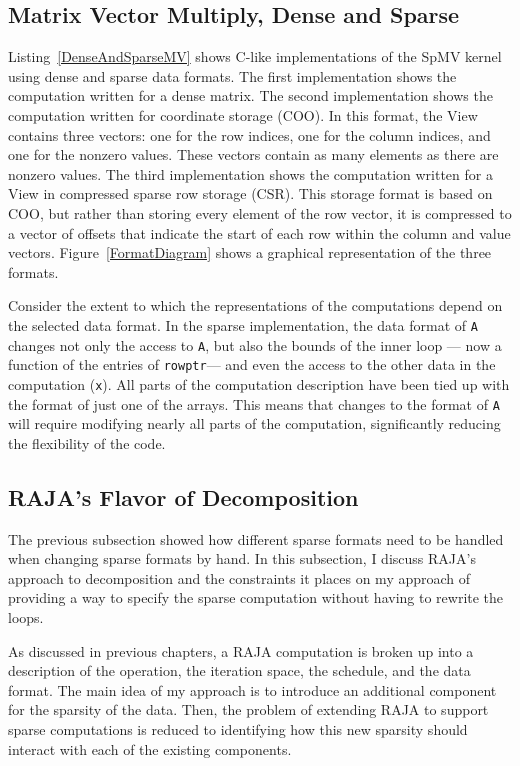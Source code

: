 \subsection{Matrix Vector Multiply, Dense and Sparse}

Listing~\ref{DenseAndSparseMV} shows C-like implementations of the SpMV kernel using dense and sparse data formats.
The first implementation shows the computation written for a dense matrix.
The second implementation shows the computation written for coordinate storage (COO). 
In this format, the View contains three vectors: one for the row indices, one for the column indices, and one for the nonzero values.
These vectors contain as many elements as there are nonzero values.
The third implementation shows the computation written for a View in compressed sparse row storage (CSR).
This storage format is based on COO, but rather than storing every element of the row vector, it is compressed to a vector of offsets that indicate the start of each row within the column and value vectors.
Figure~\ref{FormatDiagram} shows a graphical representation of the three formats.



Consider the extent to which the representations of the computations depend on the selected data format.
In the sparse implementation, the data format of \verb.A. changes not only the access to \verb.A., but also the bounds of the inner loop --- now a function of the entries of \verb.rowptr.--- and even the access to the other data in the computation (\verb.x.).
All parts of the computation description have been tied up with the format of just one of the arrays.
This means that changes to the format of \verb.A. will require modifying nearly all parts of the computation, significantly reducing the flexibility of the code.


\subsection{RAJA's Flavor of Decomposition}
The previous subsection showed how different sparse formats need to be handled when changing sparse formats by hand.  
In this subsection, I discuss RAJA's approach to decomposition and the constraints it places on my approach of providing a way to specify the sparse computation without having to rewrite the loops.

As discussed in previous chapters, a RAJA computation is broken up into a description of the operation, the iteration space, the schedule, and the data format.
The main idea of my approach is to introduce an additional component for the sparsity of the data.
Then, the problem of extending RAJA to support sparse computations is reduced to identifying how this new sparsity should interact with each of the existing components.

